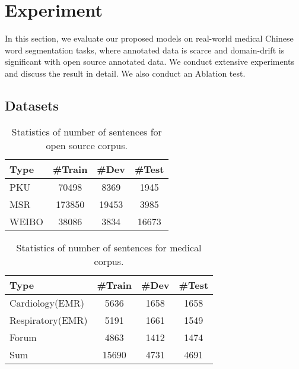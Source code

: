 \section{Experiment}

In this section, we evaluate our proposed models on real-world medical Chinese word segmentation tasks, where annotated data is scarce and domain-drift is significant with open source annotated data. We conduct extensive experiments and discuss the result in detail. We also conduct an Ablation test.


\subsection{Datasets}\label{sec:datasets}

\begin{table}[th]
\small
\centering
\caption{Statistics of number of sentences for open source corpus.}\label{table:open_source}
\begin{tabular}{lccc}
\hline
Type & \#Train & \#Dev & \#Test\\
\hline
PKU & 70498 & 8369 & 1945\\
MSR & 173850 & 19453 & 3985 \\
WEIBO & 38086 & 3834 & 16673 \\
\hline
\end{tabular}
\end{table}

\begin{table}[th]
\small
\centering
\caption{Statistics of number of sentences for medical corpus.}\label{table:medical}
\begin{tabular}{lccc}
\hline
Type & \#Train & \#Dev & \#Test\\
\hline
Cardiology(EMR) & 5636 & 1658 & 1658\\
Respiratory(EMR) & 5191 & 1661& 1549\\
Forum & 4863 & 1412 & 1474\\
\hline
Sum & 15690 & 4731 & 4691\\
\hline
\end{tabular}
\end{table}

